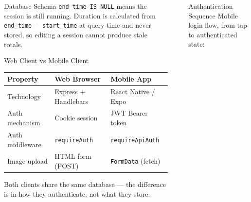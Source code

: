 \documentclass[final]{beamer}
\newlength{\sepwidth}
\newlength{\colwidth}
\newcommand{\separatorcolumn}{\begin{column}{\sepwidth}\end{column}}
\begin{document}
\begin{frame}[t,fragile]
\begin{columns}[t]
\begin{column}{\colwidth}
\begin{block}{Database Schema}
    \vspace{0.1cm}
    \texttt{end\_time IS NULL} means the session is still running. Duration is
    calculated from \texttt{end\_time~-~start\_time} at query time and never
    stored, so editing a session cannot produce stale totals.
  \end{block}

  \begin{block}{Web Client vs Mobile Client}
    \begin{center}
    \begin{tabular}{lll}
    \toprule
    \textbf{Property} & \textbf{Web Browser} & \textbf{Mobile App} \\
    \midrule
    Technology      & Express + Handlebars & React Native / Expo \\
    Auth mechanism  & Cookie session       & JWT Bearer token \\
    Auth middleware & \texttt{requireAuth} & \texttt{requireApiAuth} \\
    Image upload    & HTML form (POST)     & \texttt{FormData} (fetch) \\
    \bottomrule
    \end{tabular}
    \end{center}
    \vspace{0.1cm}
    Both clients share the same database --- the difference is in how they
    authenticate, not what they store.
  \end{block}

\end{column}

\separatorcolumn

\begin{column}{\colwidth}

  \begin{block}{Authentication Sequence}
    Mobile login flow, from tap to authenticated state:

    \vspace{0.1cm}
    \begin{center}
\end{center}
\end{block}
\end{column}
\end{columns}
\end{frame}
\end{document}
